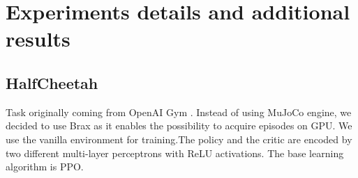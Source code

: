 




\newpage
\section{Experiments details and additional results}
\label{sec:appendix_results}




\subsection{HalfCheetah}
\label{subsec:halfcheetah}

Task originally coming from OpenAI Gym \citep{OpenaiGym}. Instead of using MuJoCo engine, we decided to use Brax \citep{brax2021github} as it enables the possibility to acquire episodes on GPU. We use the vanilla environment for training.The policy and the critic are encoded by two different multi-layer perceptrons with ReLU activations. The base learning algorithm is PPO.

